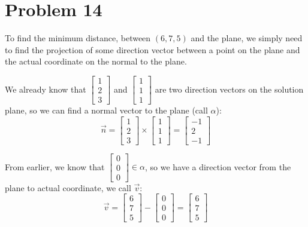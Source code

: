 \documentclass[12pt,a4paper]{article}
\begin{document}
\section*{Problem 14}
\begin{solution}
    To find the minimum distance, between $(6,7,5)$ and the plane, we simply need to find the projection of some direction vector between a point on the plane and the actual coordinate on the normal to the plane.

    We already know that 
    $
    \begin{bmatrix}
1 \\
2 \\
3
\end{bmatrix}$
and 
$\begin{bmatrix}
1 \\
1 \\
1
\end{bmatrix}$
are two direction vectors on the solution plane, so we can find a normal vector to the plane (call $\alpha$):
\[
\vec{n} = \begin{bmatrix}
1 \\
2 \\
3
\end{bmatrix}
\times
\begin{bmatrix}
1 \\
1 \\
1
\end{bmatrix}
=
\begin{bmatrix}
-1 \\
2 \\
-1
\end{bmatrix}
\]

From earlier, we know that 
$\begin{bmatrix}
    0\\0\\0
\end{bmatrix}\in \alpha$, 
so we have a direction vector from the plane to actual coordinate, we call $\vec{v}$:
\[
\vec{v} = 
\begin{bmatrix}
    6\\7\\5
\end{bmatrix}
-
\begin{bmatrix}
    0\\0\\0
\end{bmatrix}
=
\begin{bmatrix}
    6\\7\\5
\end{bmatrix}
\]
\end{solution}
\end{document}
